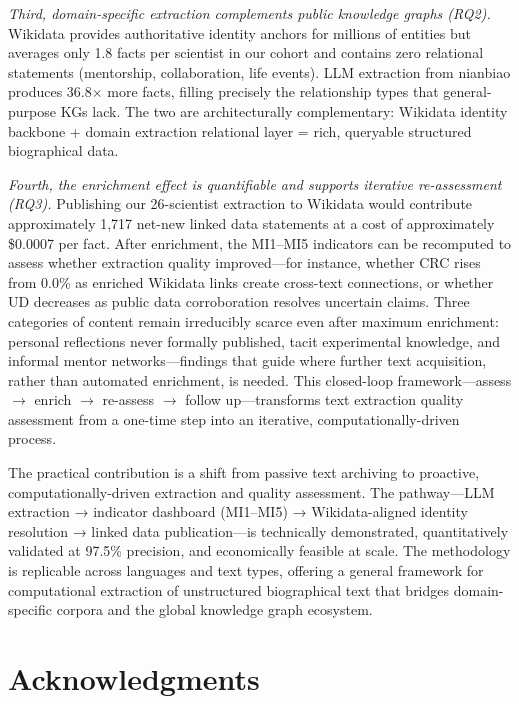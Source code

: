 \documentclass[review]{elsarticle}
\begin{document}
\textit{Third, domain-specific extraction complements public knowledge graphs (RQ2).} Wikidata provides authoritative identity anchors for millions of entities but averages only 1.8 facts per scientist in our cohort and contains zero relational statements (mentorship, collaboration, life events). LLM extraction from nianbiao produces 36.8$\times$ more facts, filling precisely the relationship types that general-purpose KGs lack. The two are architecturally complementary: Wikidata identity backbone + domain extraction relational layer = rich, queryable structured biographical data.

\textit{Fourth, the enrichment effect is quantifiable and supports iterative re-assessment (RQ3).} Publishing our 26-scientist extraction to Wikidata would contribute approximately 1,717 net-new linked data statements at a cost of approximately \$0.0007 per fact. After enrichment, the MI1--MI5 indicators can be recomputed to assess whether extraction quality improved—for instance, whether CRC rises from 0.0\% as enriched Wikidata links create cross-text connections, or whether UD decreases as public data corroboration resolves uncertain claims. Three categories of content remain irreducibly scarce even after maximum enrichment: personal reflections never formally published, tacit experimental knowledge, and informal mentor networks—findings that guide where further text acquisition, rather than automated enrichment, is needed. This closed-loop framework—assess $\rightarrow$ enrich $\rightarrow$ re-assess $\rightarrow$ follow up—transforms text extraction quality assessment from a one-time step into an iterative, computationally-driven process.

The practical contribution is a shift from passive text archiving to proactive, computationally-driven extraction and quality assessment. The pathway—LLM extraction → indicator dashboard (MI1--MI5) → Wikidata-aligned identity resolution → linked data publication—is technically demonstrated, quantitatively validated at 97.5\% precision, and economically feasible at scale. The methodology is replicable across languages and text types, offering a general framework for computational extraction of unstructured biographical text that bridges domain-specific corpora and the global knowledge graph ecosystem.

\section*{Acknowledgments}
\end{document}
